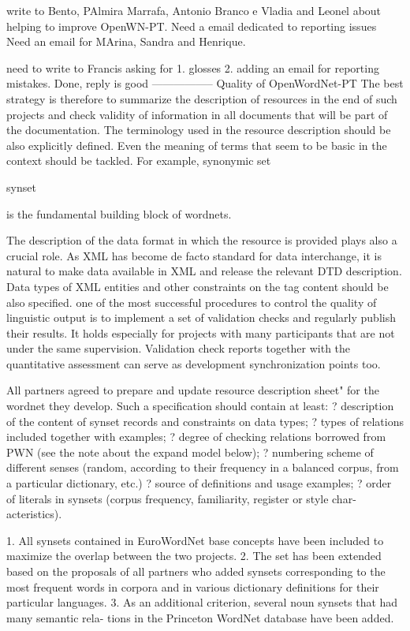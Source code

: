 write to Bento, PAlmira Marrafa, Antonio Branco e Vladia and Leonel about helping to improve OpenWN-PT.
Need a email dedicated to reporting issues
Need an email for MArina, Sandra and Henrique.

need to write to Francis asking for 
1. glosses
2. adding an email for reporting mistakes.
Done, reply is good
-----------------
Quality of OpenWordNet-PT
The best strategy is therefore to summarize the description of resources in the end of
such projects and check validity of information in all documents that will be part of
the documentation.
The terminology used in the resource description should be also explicitly defined.
Even the meaning of terms that seem to be basic in the context should be tackled.
For example, synonymic set { synset { is the fundamental building block of wordnets.

The description of the data format in which the resource is provided plays also a
crucial role. As XML has become de facto standard for data interchange, it is natural
to make data available in XML and release the relevant DTD description. Data types
of XML entities and other constraints on the tag content should be also specified.
one of the most successful procedures to control the quality of
linguistic output is to implement a set of validation checks and regularly publish their
results. It holds especially for projects with many participants that are not under the
same supervision. Validation check reports together with the quantitative assessment
can serve as development synchronization points too.

All partners agreed to prepare and update resource description sheet"
for the wordnet they develop. Such a specification should contain at
least: ? description of the content of synset records and constraints
on data types; ? types of relations included together with examples; ?
degree of checking relations borrowed from PWN (see the note about the
expand model below); ? numbering scheme of different senses (random,
according to their frequency in a balanced corpus, from a particular
dictionary, etc.)  ? source of definitions and usage examples; ? order
of literals in synsets (corpus frequency, familiarity, register or
style char- acteristics).

1. All synsets contained in EuroWordNet base concepts have been included to
maximize the overlap between the two projects.
2. The set has been extended based on the proposals of all partners who added
synsets corresponding to the most frequent words in corpora and in various
dictionary definitions for their particular languages.
3. As an additional criterion, several noun synsets that had many semantic rela-
tions in the Princeton WordNet database have been added.

}}
